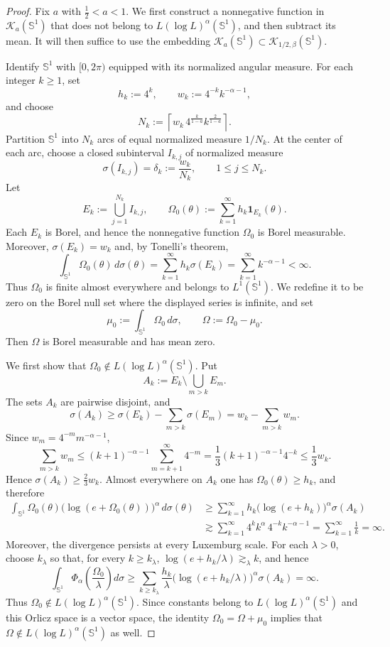 \documentclass[11pt]{amsart}
\theoremstyle{remark}
\numberwithin{equation}{section}
\newcommand{\Sph}{\mathbb S^1}
\newcommand{\cK}{\mathcal K}
\newcommand{\one}{\mathbf 1}
\begin{document}
	\begin{proof}
		Fix \(a\) with \(\frac12<a<1\).  We first construct a nonnegative function in
		\(\cK_a(\Sph)\) that does not belong to \(L(\log L)^\alpha(\Sph)\), and then
		subtract its mean. It will then suffice to use the embedding
		\(\cK_a(\Sph)\subset \cK_{1/2,\beta}(\Sph)\).
		
		Identify \(\Sph\) with \([0,2\pi)\) equipped with its normalized angular
		measure.  For each integer \(k\ge1\), set
		\[
		h_k:=4^k,\qquad w_k:=4^{-k}k^{-\alpha-1},
		\]
		and choose
		\[
		N_k:=\left\lceil
		w_k\,4^{\frac{k}{1-a}}k^{\frac{2}{1-a}}
		\right\rceil.
		\]
		Partition \(\Sph\) into \(N_k\) arcs of equal normalized measure \(1/N_k\). At
		the center of each arc, choose a closed subinterval \(I_{k,j}\) of normalized
		measure
		\[
		\sigma(I_{k,j})=\delta_k:=\frac{w_k}{N_k},
		\qquad 1\le j\le N_k.
		\]
		Let
		\[
		E_k:=\bigcup_{j=1}^{N_k}I_{k,j},
		\qquad
		\Omega_0(\theta):=\sum_{k=1}^\infty h_k\one_{E_k}(\theta).
		\]
		Each \(E_k\) is Borel, and hence the nonnegative function \(\Omega_0\) is
		Borel measurable. Moreover, \(\sigma(E_k)=w_k\) and, by Tonelli's theorem,
		\[
		\int_{\Sph}\Omega_0(\theta)\,d\sigma(\theta)
		=\sum_{k=1}^\infty h_k\sigma(E_k)
		=\sum_{k=1}^\infty k^{-\alpha-1}<\infty.
		\]
		Thus \(\Omega_0\) is finite almost everywhere and belongs to \(L^1(\Sph)\).
		We redefine it to be zero on the Borel null set where the displayed series
		is infinite, and set
		\[
		\mu_0:=\int_{\Sph}\Omega_0\,d\sigma,
		\qquad
		\Omega:=\Omega_0-\mu_0.
		\]
		Then \(\Omega\) is Borel measurable and has mean zero.
		
		We first show that \(\Omega_0\notin L(\log L)^\alpha(\Sph)\). Put
		\[
		A_k:=E_k\setminus\bigcup_{m>k}E_m.
		\]
		The sets \(A_k\) are pairwise disjoint, and
		\[
		\sigma(A_k)\ge \sigma(E_k)-\sum_{m>k}\sigma(E_m)
		=w_k-\sum_{m>k}w_m.
		\]
		Since \(w_m=4^{-m}m^{-\alpha-1}\),
		\[
		\sum_{m>k}w_m
		\le (k+1)^{-\alpha-1}\sum_{m=k+1}^\infty 4^{-m}
		=\frac13 (k+1)^{-\alpha-1}4^{-k}
		\le \frac13 w_k.
		\]
		Hence \(\sigma(A_k)\ge \frac23w_k\). Almost everywhere on \(A_k\) one has
		\(\Omega_0(\theta)\ge h_k\), and therefore
		\[
		\begin{aligned}
			\int_{\Sph}\Omega_0(\theta)
			\bigl(\log(e+\Omega_0(\theta))\bigr)^\alpha\,d\sigma(\theta)
			&\ge
			\sum_{k=1}^\infty h_k\bigl(\log(e+h_k)\bigr)^\alpha\sigma(A_k)\\
			&\gtrsim
			\sum_{k=1}^\infty 4^k k^\alpha\,4^{-k}k^{-\alpha-1}
			=\sum_{k=1}^\infty \frac1k
			=\infty.
		\end{aligned}
		\]
		Moreover, the divergence persists at every Luxemburg scale. For each
		\(\lambda>0\), choose \(k_\lambda\) so that, for every
		\(k\ge k_\lambda\),
		\(\log(e+h_k/\lambda)\gtrsim_\lambda k\), and hence
		\[
		\int_{\Sph}\Phi_\alpha\!\left(\frac{\Omega_0}{\lambda}\right)d\sigma
		\ge
		\sum_{k\ge k_\lambda}
		\frac{h_k}{\lambda}
		\bigl(\log(e+h_k/\lambda)\bigr)^\alpha\sigma(A_k)
		=\infty.
		\]
		Thus \(\Omega_0\notin L(\log L)^\alpha(\Sph)\). Since constants belong to
		\(L(\log L)^\alpha(\Sph)\) and this Orlicz space is a vector space, the
		identity \(\Omega_0=\Omega+\mu_0\) implies that
		\(\Omega\notin L(\log L)^\alpha(\Sph)\) as well.
		

\end{proof}
\end{document}
